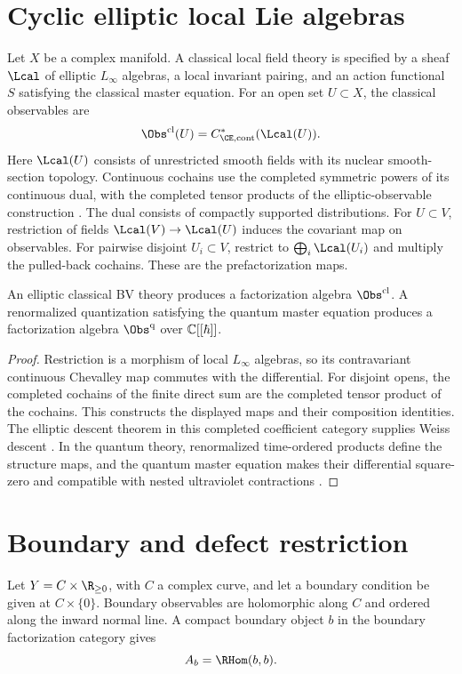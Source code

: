 \section{Cyclic elliptic local Lie algebras}
Let $X$ be a complex manifold. A classical local field theory is specified by a sheaf $\Lcal$ of elliptic $L_\infty$ algebras, a local invariant pairing, and an action functional $S$ satisfying the classical master equation. For an open set $U\subset X$, the classical observables are
\[
 \Obs^{\mathrm{cl}}(U)=C^*_{\CE,\mathrm{cont}}(\Lcal(U)).
\]
Here $\Lcal(U)$ consists of unrestricted smooth fields with its
nuclear smooth-section topology. Continuous cochains use the completed
symmetric powers of its continuous dual, with the completed tensor
products of the elliptic-observable construction \cite{CG1,CG2}.
The dual consists of compactly supported distributions.
For $U\subset V$, restriction of fields $\Lcal(V)\to\Lcal(U)$
induces the covariant map on observables.
For pairwise disjoint $U_i\subset V$, restrict to
$\bigoplus_i\Lcal(U_i)$ and multiply the pulled-back cochains.
These are the prefactorization maps.

\begin{theorem}
An elliptic classical BV theory produces a factorization algebra $\Obs^{\mathrm{cl}}$. A renormalized quantization satisfying the quantum master equation produces a factorization algebra $\Obs^{\mathrm{q}}$ over $\mathbb C[[\hbar]]$.
\end{theorem}
\begin{proof}
Restriction is a morphism of local $L_\infty$ algebras, so its
contravariant continuous Chevalley map commutes with the differential.
For disjoint opens, the completed cochains of the finite direct sum
are the completed tensor product of the cochains. This constructs
the displayed maps and their composition identities.
The elliptic descent theorem in this completed coefficient category
supplies Weiss descent \cite{CG1,CG2}. In the quantum theory, renormalized time-ordered products define the structure maps, and the quantum master equation makes their differential square-zero and compatible with nested ultraviolet contractions \cite{CG1,CG2}.
\end{proof}

\section{Boundary and defect restriction}
Let $Y=C\times\R_{\ge0}$, with $C$ a complex curve, and let a boundary condition be given at $C\times\{0\}$. Boundary observables are holomorphic along $C$ and ordered along the inward normal line. A compact boundary object $b$ in the boundary factorization category gives
\[
 A_b=\RHom(b,b).
\]

